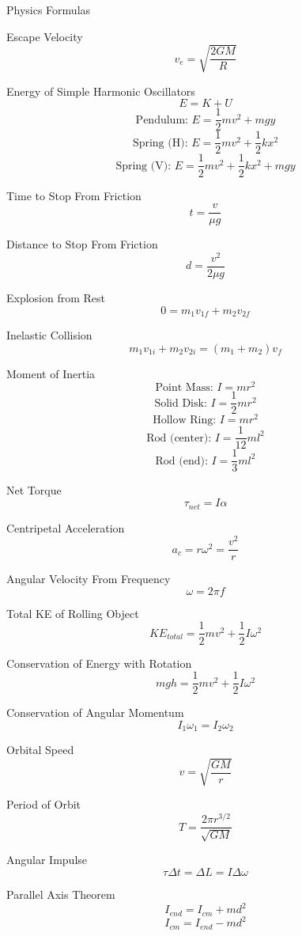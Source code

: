 Physics Formulas

Escape Velocity
$$v_e = \sqrt{\frac{2GM}{R}}$$

Energy of Simple Harmonic Oscillators
$$E = K + U$$
$$\text{Pendulum: } E = \frac{1}{2}mv^2 + mgy$$
$$\text{Spring (H): } E = \frac{1}{2}mv^2 + \frac{1}{2}kx^2$$
$$\text{Spring (V): } E = \frac{1}{2}mv^2 + \frac{1}{2}kx^2 + mgy$$

Time to Stop From Friction
$$t = \frac{v}{\mu g}$$

Distance to Stop From Friction
$$d = \frac{v^2}{2\mu g}$$

Explosion from Rest
$$0 = m_1v_{1f} + m_2v_{2f}$$

Inelastic Collision
$$m_1v_{1i} + m_2v_{2i} = (m_1 + m_2)v_f$$

Moment of Inertia
$$\text{Point Mass: } I = mr^2$$
$$\text{Solid Disk: } I = \frac{1}{2}mr^2$$
$$\text{Hollow Ring: } I = mr^2$$
$$\text{Rod (center): } I = \frac{1}{12}ml^2$$
$$\text{Rod (end): } I = \frac{1}{3}ml^2$$

Net Torque
$$\tau_{net} = I\alpha$$

Centripetal Acceleration
$$a_c = r\omega^2 = \frac{v^2}{r}$$

Angular Velocity From Frequency
$$\omega = 2\pi f$$

Total KE of Rolling Object
$$KE_{total} = \frac{1}{2}mv^2 + \frac{1}{2}I\omega^2$$

Conservation of Energy with Rotation
$$mgh = \frac{1}{2}mv^2 + \frac{1}{2}I\omega^2$$

Conservation of Angular Momentum
$$I_1\omega_1 = I_2\omega_2$$

Orbital Speed
$$v = \sqrt{\frac{GM}{r}}$$

Period of Orbit
$$T = \frac{2\pi r^{3/2}}{\sqrt{GM}}$$

Angular Impulse
$$\tau\Delta t = \Delta L = I\Delta\omega$$

Parallel Axis Theorem
$$I_{end} = I_{cm} + md^2$$
$$I_{cm} = I_{end} - md^2$$
